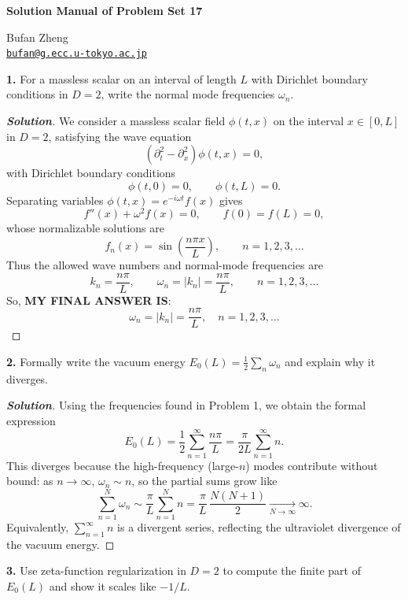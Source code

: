 \documentclass[11pt]{article}
\newenvironment{solution}[1][]{\begin{proof}[\textbf{Solution}]}{\end{proof}}
\begin{document}
\begin{center}
    {\LARGE \textbf{Solution Manual of Problem Set 17} \par}
    \vspace{1em}
    {\large Bufan Zheng\\ \href{mailto:bufan@g.ecc.u-tokyo.ac.jp}{\texttt{bufan@g.ecc.u-tokyo.ac.jp}} \par}
\end{center}


\begin{tcolorbox}[problem]
\textbf{1.} For a massless scalar on an interval of length $L$ with Dirichlet boundary conditions in $D=2$, write the normal mode frequencies $\omega_n$.
\end{tcolorbox}
\begin{solution}[17.1]
		We consider a massless scalar field $\phi(t,x)$ on the interval $x\in[0,L]$ in $D=2$,
		satisfying the wave equation
		\[
		(\partial_t^2-\partial_x^2)\phi(t,x)=0,
		\]
		with Dirichlet boundary conditions
		\[
		\phi(t,0)=0,\qquad \phi(t,L)=0.
		\]
		Separating variables $\phi(t,x)=e^{-i\omega t}f(x)$ gives
		\[
		f''(x)+\omega^2 f(x)=0,\qquad f(0)=f(L)=0,
		\]
		whose normalizable solutions are
		\[
		f_n(x)=\sin\!\left(\frac{n\pi x}{L}\right),\qquad n=1,2,3,\ldots
		\]
		Thus the allowed wave numbers and normal-mode frequencies are
		\[
		k_n=\frac{n\pi}{L},\qquad \omega_n=|k_n|=\frac{n\pi}{L},\qquad n=1,2,3,\ldots
		\]
		So, \textbf{MY FINAL ANSWER IS}:
		\[
		\boxed{
		\omega_n=|k_n|=\frac{n\pi}{L},\quad n=1,2,3,\ldots
		}
		\]
\end{solution}
\begin{tcolorbox}[problem]
\textbf{2.} Formally write the vacuum energy $E_0(L)=\frac12\sum_n\omega_n$ and explain why it diverges.
\end{tcolorbox}
\begin{solution}[17.2]
	Using the frequencies found in Problem 1, we obtain the formal expression
	\[
	E_0(L)=\frac{1}{2}\sum_{n=1}^{\infty}\frac{n\pi}{L}
	=\frac{\pi}{2L}\sum_{n=1}^{\infty} n.
	\]
	This diverges because the high-frequency (large-$n$) modes contribute without bound:
	as $n\to\infty$, $\omega_n\sim n$, so the partial sums grow like
	\[
	\sum_{n=1}^{N}\omega_n \sim \frac{\pi}{L}\sum_{n=1}^{N} n
	= \frac{\pi}{L}\,\frac{N(N+1)}{2}\xrightarrow[N\to\infty]{}\infty.
	\]
	Equivalently, $\sum_{n=1}^{\infty} n$ is a divergent series, reflecting the ultraviolet divergence of the vacuum energy.
\end{solution}
\begin{tcolorbox}[problem]
\textbf{3.} Use zeta-function regularization in $D=2$ to compute the finite part of $E_0(L)$ and show it scales like $-1/L$.
\end{tcolorbox}
\end{document}
